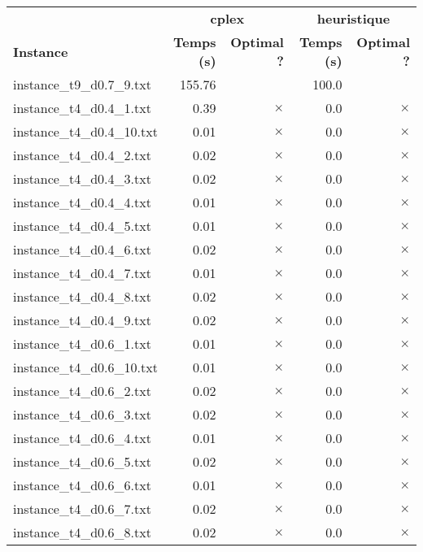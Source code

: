 \documentclass{article}
\begin{document}
\newpage
\begin{center}
\renewcommand{\arraystretch}{1.4}
 \begin{tabular}{lrrrr}
	\hline
 & \multicolumn{2}{c}{\textbf{cplex}} & \multicolumn{2}{c}{\textbf{heuristique}}\\
\textbf{Instance}  & \textbf{Temps (s)} & \textbf{Optimal ?}  & \textbf{Temps (s)} & \textbf{Optimal ?} \\\hline

instance\_t9\_d0.7\_9.txt & 155.76 & 
 & 100.0 & 
\\
instance\_t4\_d0.4\_1.txt & 0.39 & 
$\times$
 & 0.0 & 
$\times$
\\
instance\_t4\_d0.4\_10.txt & 0.01 & 
$\times$
 & 0.0 & 
$\times$
\\
instance\_t4\_d0.4\_2.txt & 0.02 & 
$\times$
 & 0.0 & 
$\times$
\\
instance\_t4\_d0.4\_3.txt & 0.02 & 
$\times$
 & 0.0 & 
$\times$
\\
instance\_t4\_d0.4\_4.txt & 0.01 & 
$\times$
 & 0.0 & 
$\times$
\\
instance\_t4\_d0.4\_5.txt & 0.01 & 
$\times$
 & 0.0 & 
$\times$
\\
instance\_t4\_d0.4\_6.txt & 0.02 & 
$\times$
 & 0.0 & 
$\times$
\\
instance\_t4\_d0.4\_7.txt & 0.01 & 
$\times$
 & 0.0 & 
$\times$
\\
instance\_t4\_d0.4\_8.txt & 0.02 & 
$\times$
 & 0.0 & 
$\times$
\\
instance\_t4\_d0.4\_9.txt & 0.02 & 
$\times$
 & 0.0 & 
$\times$
\\
instance\_t4\_d0.6\_1.txt & 0.01 & 
$\times$
 & 0.0 & 
$\times$
\\
instance\_t4\_d0.6\_10.txt & 0.01 & 
$\times$
 & 0.0 & 
$\times$
\\
instance\_t4\_d0.6\_2.txt & 0.02 & 
$\times$
 & 0.0 & 
$\times$
\\
instance\_t4\_d0.6\_3.txt & 0.02 & 
$\times$
 & 0.0 & 
$\times$
\\
instance\_t4\_d0.6\_4.txt & 0.01 & 
$\times$
 & 0.0 & 
$\times$
\\
instance\_t4\_d0.6\_5.txt & 0.02 & 
$\times$
 & 0.0 & 
$\times$
\\
instance\_t4\_d0.6\_6.txt & 0.01 & 
$\times$
 & 0.0 & 
$\times$
\\
instance\_t4\_d0.6\_7.txt & 0.02 & 
$\times$
 & 0.0 & 
$\times$
\\
instance\_t4\_d0.6\_8.txt & 0.02 & 
$\times$
 & 0.0 & 
$\times$
\\

\end{tabular}
\end{center}
\end{document}
